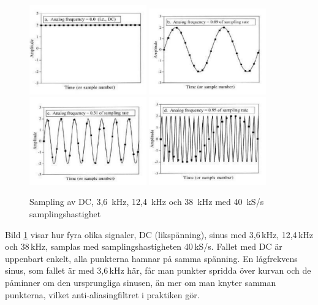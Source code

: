 \begin{figure}
\begin{center}
\includegraphics[width=0.45\textwidth]{images/cropped_pdfs/bild_2_1-38.pdf}
\includegraphics[width=0.45\textwidth]{images/cropped_pdfs/bild_2_1-39.pdf}
\includegraphics[width=0.45\textwidth]{images/cropped_pdfs/bild_2_1-40.pdf}
\includegraphics[width=0.45\textwidth]{images/cropped_pdfs/bild_2_1-41.pdf}
\caption{Sampling av DC, 3,6~kHz, 12,4~kHz och 38~kHz med 40~kS/s samplingshastighet}
\label{fig:BildII1-38}
\end{center}
\end{figure}

Bild \ref{fig:BildII1-38} visar hur fyra olika signaler, DC (likspänning), 
sinus med
3,6\,kHz, 12,4\,kHz och 38\,kHz, samplas med samplingshastigheten 40\,kS/s.
Fallet med DC är uppenbart enkelt, alla punkterna hamnar på samma spänning.
En lågfrekvens sinus, som fallet är med 3,6\,kHz här, får man punkter spridda
över kurvan och de påminner om den ursprungliga sinusen, än mer om man knyter
samman punkterna, vilket anti-aliasingfiltret i praktiken gör.

